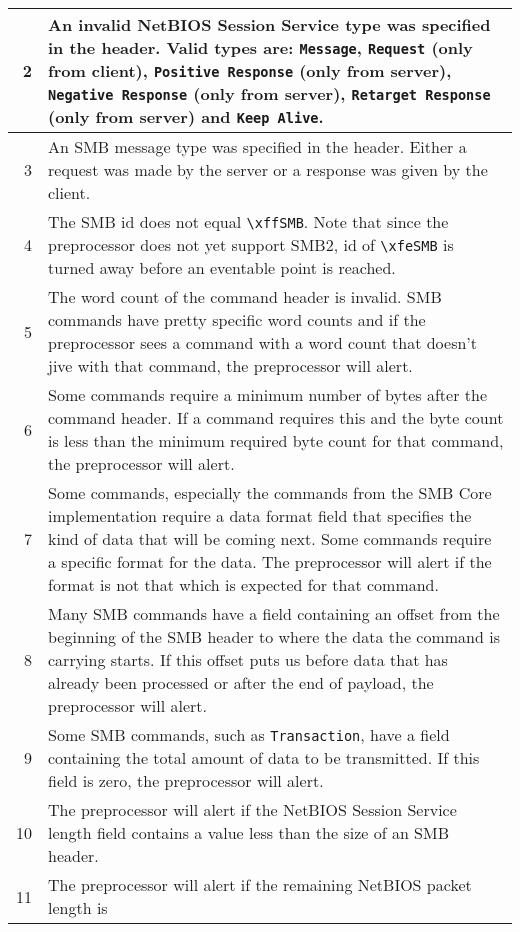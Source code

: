 \documentclass[english]{report}
\begin{document}
\begin{itemize}
\begin{longtable}{|r|p{13.5cm}|}
\hline
  2 & An invalid NetBIOS Session Service type was specified in the header.
      Valid types are: \texttt{Message}, \texttt{Request} (only from client),
      \texttt{Positive Response} (only from server), \texttt{Negative Response}
      (only from server), \texttt{Retarget Response} (only from server) and
      \texttt{Keep Alive}.\\
\hline
  3 & An SMB message type was specified in the header. Either a request was
      made by the server or a response was given by the client.\\
\hline
  4 & The SMB id does not equal \texttt{\textbackslash xffSMB}. Note that since
      the preprocessor does not yet support SMB2, id of
      \texttt{\textbackslash xfeSMB} is turned away before an eventable point is
      reached.\\
\hline
  5 & The word count of the command header is invalid. SMB commands have
      pretty specific word counts and if the preprocessor sees a command with
      a word count that doesn't jive with that command, the preprocessor will
      alert.\\
\hline
  6 & Some commands require a minimum number of bytes after the command
      header. If a command requires this and the byte count is less than the
      minimum required byte count for that command, the preprocessor will
      alert.\\
\hline
  7 & Some commands, especially the commands from the SMB Core implementation
      require a data format field that specifies the kind of data that will be
      coming next. Some commands require a specific format for the data. The
      preprocessor will alert if the format is not that which is expected for
      that command.\\
\hline
  8 & Many SMB commands have a field containing an offset from the beginning
      of the SMB header to where the data the command is carrying starts. If
      this offset puts us before data that has already been processed or after
      the end of payload, the preprocessor will alert.\\
\hline
  9 & Some SMB commands, such as \texttt{Transaction}, have a field containing
      the total amount of data to be transmitted. If this field is zero, the
      preprocessor will alert.\\
\hline
 10 & The preprocessor will alert if the NetBIOS Session Service length field
      contains a value less than the size of an SMB header.\\
\hline
 11 & The preprocessor will alert if the remaining NetBIOS packet length is

\end{longtable}
\end{itemize}
\end{document}
